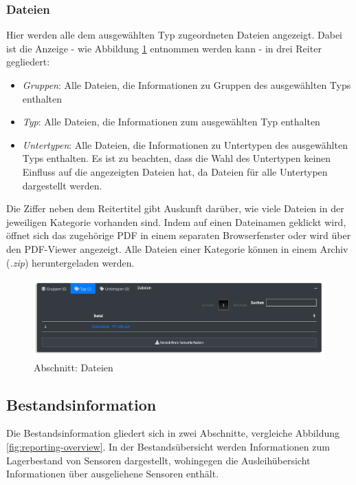 \documentclass[
]{article}
\providecommand{\tightlist}{%
  \setlength{\itemsep}{0pt}\setlength{\parskip}{0pt}}
\begin{document}
\hypertarget{dateien}{%
\subsubsection{Dateien}\label{dateien}}

Hier werden alle dem ausgewählten Typ zugeordneten Dateien angezeigt. Dabei ist die Anzeige - wie Abbildung \ref{fig:operate-detail-files} entnommen werden kann - in drei Reiter gegliedert:

\begin{itemize}
\tightlist
\item
  \emph{Gruppen}: Alle Dateien, die Informationen zu Gruppen des ausgewählten Typs enthalten
\item
  \emph{Typ}: Alle Dateien, die Informationen zum ausgewählten Typ enthalten
\item
  \emph{Untertypen}: Alle Dateien, die Informationen zu Untertypen des ausgewählten Typs enthalten. Es ist zu beachten, dass die Wahl des Untertypen keinen Einfluss auf die angezeigten Dateien hat, da Dateien für alle Untertypen dargestellt werden.
\end{itemize}

Die Ziffer neben dem Reitertitel gibt Auskunft darüber, wie viele Dateien in der jeweiligen Kategorie vorhanden sind. Indem auf einen Dateinamen geklickt wird, öffnet sich das zugehörige PDF in einem separaten Browserfenster oder wird über den PDF-Viewer angezeigt. Alle Dateien einer Kategorie können in einem Archiv (\emph{.zip}) heruntergeladen werden.

\begin{figure}
\centering
\includegraphics{./img/operate_detail_files.png}
\caption{\label{fig:operate-detail-files}Abschnitt: Dateien}
\end{figure}

\hypertarget{reporting}{%
\subsection{Bestandsinformation}\label{reporting}}

Die Bestandsinformation gliedert sich in zwei Abschnitte, vergleiche Abbildung \ref{fig:reporting-overview}. In der Bestandsübersicht werden Informationen zum Lagerbestand von Sensoren dargestellt, wohingegen die Ausleihübersicht Informationen über ausgeliehene Sensoren enthält.
\end{document}
